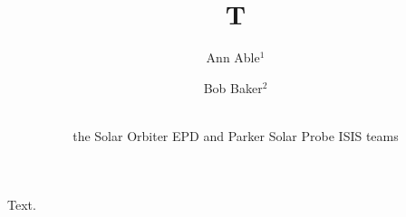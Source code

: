 \documentclass{article}
\begin{document}
\title{T}
\author{Ann Able$^1$
  \and Bob Baker$^2$
  \and \\the Solar Orbiter EPD and Parker Solar Probe ISIS teams
}
\maketitle
Text.
\end{document}
